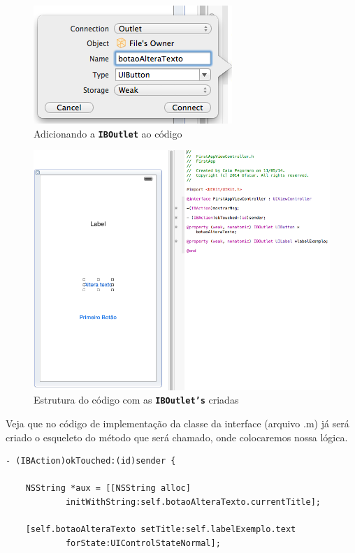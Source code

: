 \documentclass[a4paper,12pt,brazil,doubleside]{book}
\begin{document}
\begin{singlespace}
\begin{figure}[H]
  \centering
  \includegraphics[width=.65\textwidth]{figuras/3/tela_novo_projeto_29.png}
  \caption{Adicionando a \texttt{\textbf{IBOutlet}} ao código}
  \label{fig:a}
\end{figure}

\begin{figure}[H]
  \centering
  \includegraphics[width=.75\textwidth]{figuras/3/tela_novo_projeto_30.png}
  \caption{Estrutura do código com as \texttt{\textbf{IBOutlet's}} criadas}
  \label{fig:a}
\end{figure}


Veja que no código de implementação da classe da interface (arquivo .m) já será criado o esqueleto do método que será chamado, onde colocaremos nossa lógica.

\begin{listing}[H]
\begin{verbatim}
- (IBAction)okTouched:(id)sender {
    
    NSString *aux = [[NSString alloc] 
    		initWithString:self.botaoAlteraTexto.currentTitle];
    
    [self.botaoAlteraTexto setTitle:self.labelExemplo.text 
    		forState:UIControlStateNormal];
    

\end{verbatim}
\end{listing}
\end{singlespace}
\end{document}
